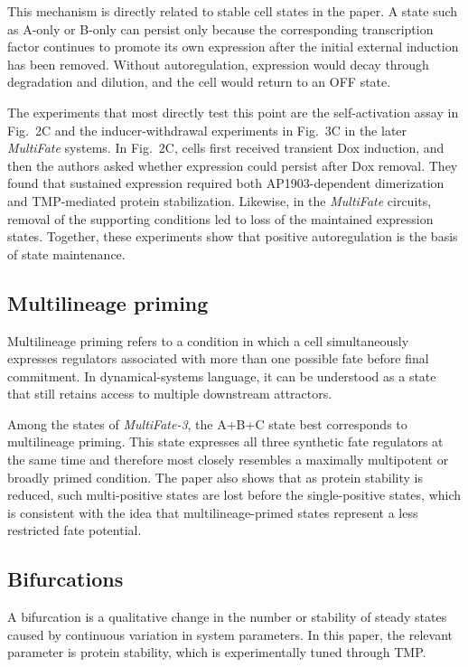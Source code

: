 \documentclass[12pt,a4paper]{article}
\begin{document}
This mechanism is directly related to stable cell states in the paper. A state such as A-only or B-only can persist only because the corresponding transcription factor continues to promote its own expression after the initial external induction has been removed. Without autoregulation, expression would decay through degradation and dilution, and the cell would return to an OFF state.

The experiments that most directly test this point are the self-activation assay in Fig.~2C and the inducer-withdrawal experiments in Fig.~3C in the later \textit{MultiFate} systems. In Fig.~2C, cells first received transient Dox induction, and then the authors asked whether expression could persist after Dox removal. They found that sustained expression required both AP1903-dependent dimerization and TMP-mediated protein stabilization. Likewise, in the \textit{MultiFate} circuits, removal of the supporting conditions led to loss of the maintained expression states. Together, these experiments show that positive autoregulation is the basis of state maintenance.

\subsection{Multilineage priming}
Multilineage priming refers to a condition in which a cell simultaneously expresses regulators associated with more than one possible fate before final commitment. In dynamical-systems language, it can be understood as a state that still retains access to multiple downstream attractors.

Among the states of \textit{MultiFate-3}, the A+B+C state best corresponds to multilineage priming. This state expresses all three synthetic fate regulators at the same time and therefore most closely resembles a maximally multipotent or broadly primed condition. The paper also shows that as protein stability is reduced, such multi-positive states are lost before the single-positive states, which is consistent with the idea that multilineage-primed states represent a less restricted fate potential.

\subsection{Bifurcations}
A bifurcation is a qualitative change in the number or stability of steady states caused by continuous variation in system parameters. In this paper, the relevant parameter is protein stability, which is experimentally tuned through TMP.
\end{document}
